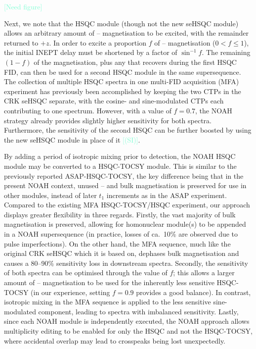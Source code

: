 \documentclass[11pt]{article}
\newcommand*{\carbon}{\ce{^{13}C}}
\newcommand*{\proton}{\ce{^{1}H}}
\newcommand*{\hl}[1]{\textcolor{Aquamarine}{[#1]}}
\newcommand*{\sitodo}{\hl{(SI)}}
\begin{document}
\hl{Need figure}

Next, we note that the HSQC module (though not the new seHSQC module) allows an arbitrary amount of \carbon{}--\proton{} magnetisation to be excited, with the remainder returned to $+z$.  In order to excite a proportion $f$ of \carbon{}--\proton{} magnetisation ($0 < f \leq 1$), the initial INEPT delay must be shortened by a factor of $\sin^{-1}f$.
The remaining $(1 - f)$ of the magnetisation, plus any that recovers during the first HSQC FID, can then be used for a second HSQC module in the same supersequence.
The collection of multiple HSQC spectra in one multi-FID acquisition (MFA) experiment has previously been accomplished by keeping the two CTPs in the CRK seHSQC separate, with the cosine- and sine-modulated CTPs each contributing to one spectrum.\autocite{ctphsqc}
However, with a value of $f = 0.7$, the NOAH strategy already provides slightly higher sensitivity for both spectra.
Furthermore, the sensitivity of the second HSQC can be further boosted by using the new seHSQC module in place of it \sitodo{}.

By adding a period of isotropic mixing prior to detection, the NOAH HSQC module may be converted to a HSQC-TOCSY module.
This is similar to the previously reported ASAP-HSQC-TOCSY,\autocite{Becker2019JMR} the key difference being that in the present NOAH context, unused \carbon{}--\proton{} and bulk magnetisation is preserved for use in other modules, instead of later $t_1$ increments as in the ASAP experiment.
Compared to the existing MFA HSQC-TOCSY/HSQC experiment,\autocite{Nolis2019CPC} our approach displays greater flexibility in three regards.
Firstly, the vast majority of bulk magnetisation is preserved, allowing for homonuclear module(s) to be appended in a NOAH supersequence (in practice, losses of ca.\ 10\% are observed due to pulse imperfections).
On the other hand, the MFA sequence, much like the original CRK seHSQC which it is based on, dephases bulk magnetisation and causes a 80--90\% sensitivity loss in downstream spectra.
Secondly, the sensitivity of both spectra can be optimised through the value of $f$; this allows a larger amount of \carbon{}--\proton{} magnetisation to be used for the inherently less sensitive HSQC-TOCSY (in our experience, setting $f = 0.9$ provides a good balance).
In contrast, isotropic mixing in the MFA sequence is applied to the less sensitive sine-modulated component, leading to spectra with imbalanced sensitivity.
Lastly, since each NOAH module is independently executed, the NOAH approach allows multiplicity editing to be enabled for only the HSQC and not the HSQC-TOCSY, where accidental overlap may lead to crosspeaks being lost unexpectedly.
\end{document}
